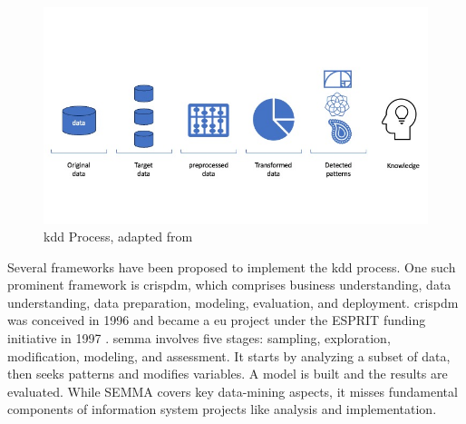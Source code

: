 \begin{figure}
\centering
\includegraphics[scale=0.55]{figures/imagens-tese.jpg}

\caption{\ac{kdd} Process, adapted from \cite{Fayyad_Piatetsky-Shapiro_Smyth_1996}} \label{fig:kdd-generic}
\end{figure}

Several frameworks have been proposed to implement the \ac{kdd} process. One such prominent framework is \ac{crispdm}, which comprises business understanding, data understanding, data preparation, modeling, evaluation, and deployment. \ac{crispdm} was conceived in 1996 and became a \ac{eu} project under the ESPRIT funding initiative in 1997 \cite{Chapman2000CRISPDM1S}. \ac{semma} \cite{rohanizadehProposedDataMining2009} involves five stages: sampling, exploration, modification, modeling, and assessment. It starts by analyzing a subset of data, then seeks patterns and modifies variables. A model is built and the results are evaluated. While SEMMA covers key data-mining aspects, it misses fundamental components of information system projects like analysis and implementation.

